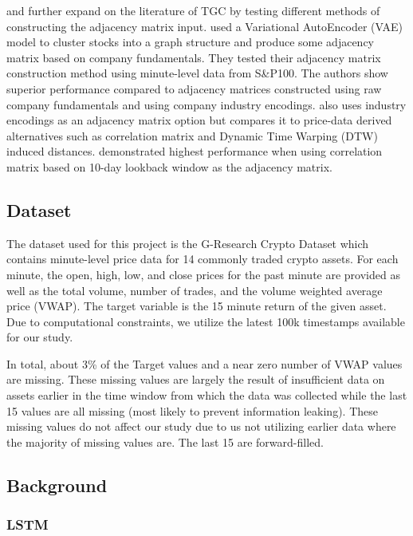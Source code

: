 \cite{Hou2021} and \cite{Peng2021} further expand on the literature of TGC by testing different methods of constructing the adjacency matrix input. \cite{Hou2021} used a Variational AutoEncoder (VAE) model to cluster stocks into a graph structure and produce some adjacency matrix based on company fundamentals. They tested their adjacency matrix construction method using minute-level data from S\&P100. The authors show superior performance compared to adjacency matrices constructed using raw company fundamentals and using company industry encodings. \cite{Peng2021} also uses industry encodings as an adjacency matrix option but compares it to price-data derived alternatives such as correlation matrix and Dynamic Time Warping (DTW) induced distances. \citeauthor{Peng2021} demonstrated highest performance when using correlation matrix based on 10-day lookback window as the adjacency matrix.

\subsection{Dataset} \label{Dataset}

The dataset used for this project is the G-Research Crypto Dataset which contains minute-level price data for 14 commonly traded crypto assets. For each minute, the open, high, low, and close prices for the past minute are provided as well as the total volume, number of trades, and the volume weighted average price (VWAP). The target variable is the 15 minute return of the given asset. Due to computational constraints, we utilize the latest 100k timestamps available for our study.

In total, about 3\% of the Target values and a near zero number of VWAP values are missing. These missing values are largely the result of insufficient data on assets earlier in the time window from which the data was collected while the last 15 values are all missing (most likely to prevent information leaking). These missing values do not affect our study due to us not utilizing earlier data where the majority of missing values are. The last 15 are forward-filled.

\subsection{Background} \label{Background}

\subsubsection{LSTM} \label{LSTM}

